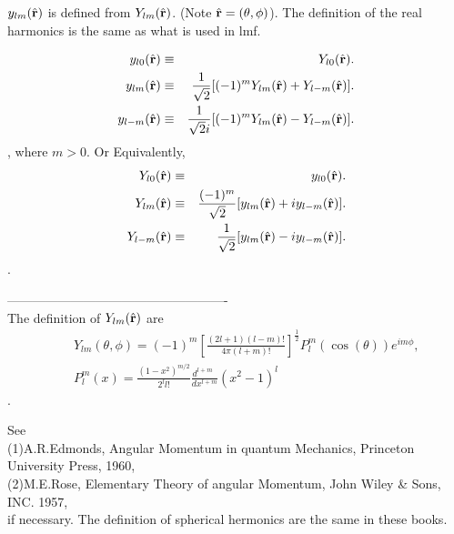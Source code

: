 \documentclass[a4paper,10pt,epsf,fleqn]{article}
\begin{document}
$y_{lm}(\hat{\bf r})$ is defined from $Y_{lm}(\hat{\bf r})$.
(Note $\hat{\bf r}=(\theta, \phi)$). The definition of the 
real harmonics is the same as what is used in lmf.

\begin{eqnarray}
 y_{l0}(\hat{\bf r}) 
  &\equiv& Y_{l0}(\hat{\bf r}). \\
 y_{lm}(\hat{\bf r}) 
  &\equiv& \frac{1}{\sqrt{2}}
           [ (-1)^m Y_{lm}(\hat{\bf r}) + Y_{l-m}(\hat{\bf r}) ]. \\
 y_{l-m}(\hat{\bf r})
  &\equiv& \frac{1}{\sqrt{2}i}
           [ (-1)^m Y_{lm}(\hat{\bf r}) - Y_{l-m}(\hat{\bf r}) ].
\end{eqnarray}
, where $m>0$. Or Equivalently,
\begin{eqnarray}
 Y_{l0}(\hat{\bf r}) 
  &\equiv& y_{l0}(\hat{\bf r}). \\
 Y_{lm}(\hat{\bf r}) 
  &\equiv& \frac{(-1)^m}{\sqrt{2}}
           [ y_{lm}(\hat{\bf r}) + iy_{l-m}(\hat{\bf r}) ]. \\
 Y_{l-m}(\hat{\bf r})
  &\equiv& \frac{1}{\sqrt{2}}
           [ y_{lm}(\hat{\bf r}) - iy_{l-m}(\hat{\bf r}) ].
\end{eqnarray}.

----------------------------------------------------\\
The definition of $Y_{lm}(\hat{\bf r})$ are
\begin{eqnarray}
&&Y_{lm}(\theta, \phi)
=(-1)^m \left[ \frac{(2l+1)(l-m)!}{4 \pi (l+m)!} \right]^{\frac{1}{2}} P^m_l(\cos(\theta)) e^{i m \phi}, \\
&&P^m_l(x) = \frac{(1-x^2)^{m/2}}{2^l l!}\frac{d^{l+m} \ \ }{dx^{l+m}} (x^2-1)^l
\end{eqnarray}.

\noindent See\\
(1)A.R.Edmonds, Angular Momentum in quantum Mechanics, 
Princeton University Press, 1960,\\
(2)M.E.Rose, Elementary Theory of angular Momentum,
John Wiley \& Sons, INC. 1957,\\
if necessary. The definition of spherical hermonics are the same in these books.


%





\newpage
\end{document}
